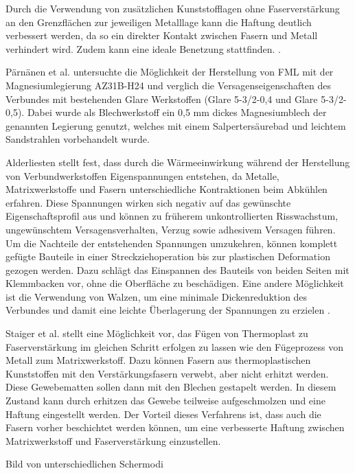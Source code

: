 Durch die Verwendung von zusätzlichen Kunststofflagen ohne Faserverstärkung an den Grenzflächen zur jeweiligen Metalllage kann die Haftung deutlich verbessert werden, da so ein direkter Kontakt zwischen Fasern und Metall verhindert wird.
Zudem kann eine ideale Benetzung stattfinden. \cite{Marissen.1988}.


Pärnänen et al.\cite{Parnanen.2012} untersuchte die Möglichkeit der Herstellung von FML mit der Magnesiumlegierung AZ31B-H24 und verglich die Versagenseigenschaften des Verbundes mit bestehenden Glare Werkstoffen (Glare 5-3/2-0,4 und Glare 5-3/2-0,5).
Dabei wurde als Blechwerkstoff ein 0,5 mm dickes Magnesiumblech der genannten Legierung genutzt, welches mit einem Salpertersäurebad und leichtem Sandstrahlen vorbehandelt wurde.

Alderliesten \cite{Alderliesten.2009} stellt fest, dass durch die Wärmeeinwirkung während der Herstellung von Verbundwerkstoffen Eigenspannungen entstehen, da Metalle, Matrixwerkstoffe und Fasern unterschiedliche Kontraktionen beim Abkühlen erfahren.
Diese Spannungen wirken sich negativ auf das gewünschte Eigenschaftsprofil aus und können zu früherem unkontrollierten Risswachstum, ungewünschtem Versagensverhalten, Verzug sowie adhesivem Versagen führen.
Um die Nachteile der entstehenden Spannungen umzukehren, können komplett gefügte Bauteile in einer Streckziehoperation bis zur plastischen Deformation gezogen werden.
Dazu schlägt \cite{Delft.1} das Einspannen des Bauteils von beiden Seiten mit Klemmbacken vor, ohne die Oberfläche zu beschädigen.
Eine andere Möglichkeit ist die Verwendung von Walzen, um eine minimale Dickenreduktion des Verbundes und damit eine leichte Überlagerung der Spannungen zu erzielen \cite{Vogelesang.1989}.

Staiger et al. \cite{Staiger.2014} stellt eine Möglichkeit vor, das Fügen von Thermoplast zu Faserverstärkung im gleichen Schritt erfolgen zu lassen wie den Fügeprozess von Metall zum Matrixwerkstoff.
Dazu können Fasern aus thermoplastischen Kunststoffen mit den Verstärkungsfasern verwebt, aber nicht erhitzt werden.
Diese Gewebematten sollen dann mit den Blechen gestapelt werden.
In diesem Zustand kann durch erhitzen das Gewebe teilweise aufgeschmolzen und eine Haftung eingestellt werden.
Der Vorteil dieses Verfahrens ist, dass auch die Fasern vorher beschichtet werden können, um eine verbesserte Haftung zwischen Matrixwerkstoff und Faserverstärkung einzustellen.


Bild von unterschiedlichen Schermodi


